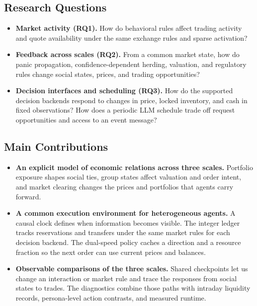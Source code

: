 \subsection{Research Questions}
\label{sec:rq}

\begin{itemize}[leftmargin=*,itemsep=3pt]
 \item \textbf{Market activity (RQ1).} How do behavioral rules affect trading activity and quote availability under the same exchange rules and sparse activation?
 \item \textbf{Feedback across scales (RQ2).} From a common market state, how do panic propagation, confidence-dependent herding, valuation, and regulatory rules change social states, prices, and trading opportunities?
 \item \textbf{Decision interfaces and scheduling (RQ3).} How do the supported decision backends respond to changes in price, locked inventory, and cash in fixed observations? How does a periodic LLM schedule trade off request opportunities and access to an event message?
\end{itemize}

\subsection{Main Contributions}
\label{sec:contributions}

\begin{itemize}[leftmargin=*,itemsep=2pt]
 \item \textbf{An explicit model of economic relations across three scales.} Portfolio exposure shapes social ties, group states affect valuation and order intent, and market clearing changes the prices and portfolios that agents carry forward.
 \item \textbf{A common execution environment for heterogeneous agents.} A causal clock defines when information becomes visible. The integer ledger tracks reservations and transfers under the same market rules for each decision backend. The dual-speed policy caches a direction and a resource fraction so the next order can use current prices and balances.
 \item \textbf{Observable comparisons of the three scales.} Shared checkpoints let us change an interaction or market rule and trace the responses from social states to trades. The diagnostics combine those paths with intraday liquidity records, persona-level action contrasts, and measured runtime.
\end{itemize}

